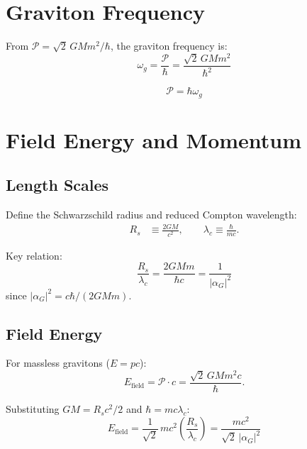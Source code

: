 \documentclass[11pt,a4paper]{article}
\theoremstyle{definition}
\theoremstyle{remark}
\begin{document}
	\section{Graviton Frequency}
	
	From $\mathcal{P}=\sqrt{2}\,GMm^2/\hbar$, the graviton frequency is:
	\begin{equation}
		\omega_g = \frac{\mathcal{P}}{\hbar} = \frac{\sqrt{2}\,GMm^2}{\hbar^2}
	\end{equation}
	
	\begin{equation}
		\boxed{\mathcal{P} = \hbar\omega_g}
	\end{equation}
	
	\section{Field Energy and Momentum}
	
	\subsection{Length Scales}
	
	Define the Schwarzschild radius and reduced Compton wavelength:
	\begin{align}
		R_s &\equiv \frac{2GM}{c^2}, \qquad \lambda_c \equiv \frac{\hbar}{mc}.
	\end{align}
	
	Key relation:
	\begin{equation}
		\frac{R_s}{\lambda_c} = \frac{2GMm}{\hbar c} = \frac{1}{|\alpha_G|^2}
		\label{eq:Rs_lambda_relation}
	\end{equation}
	since $|\alpha_G|^2 = c\hbar/(2GMm)$.
	
	\subsection{Field Energy}
	
	For massless gravitons ($E=pc$):
	\begin{equation}
		E_{\mathrm{field}} = \mathcal{P}\cdot c = \frac{\sqrt{2}\,GMm^2c}{\hbar}.
	\end{equation}
	
	Substituting $GM=R_sc^2/2$ and $\hbar=mc\lambda_c$:
	\begin{equation}
		\boxed{E_{\mathrm{field}} = \frac{1}{\sqrt{2}}\,mc^2\left(\frac{R_s}{\lambda_c}\right) = \frac{mc^2}{\sqrt{2}\,|\alpha_G|^2}}
		\label{eq:E_field}
	\end{equation}
	
\end{document}
